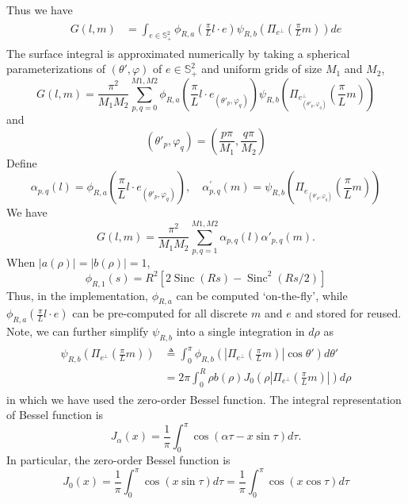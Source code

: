 \documentclass[11pt]{amsart}
\newcommand{\Sinc}{\operatorname{Sinc}}
\begin{document}
Thus we have
\begin{multline*}
\begin{split}
G(l, m)
 & = \int_{e \in \mathbb{S}^{2}_+} \phi_{R,a}\left(\frac{\pi}{L}l\cdot e\right) 
 \psi_{R,b}\left(\Pi_{e^{\perp}}(\frac{\pi}{L}m)\right)  de
\end{split}
\end{multline*}
The surface integral is approximated numerically by taking a spherical parameterizations of $(\theta', \varphi)$ of $e \in \mathbb{S}^{2}_+$ and uniform grids of size $M_1$ and $M_2$,
\begin{equation*}
G(l, m)
  = \frac{\pi^2}{M_1M_2}\sum_{p,q=0}^{M1,M2} \phi_{R,a}\left(\frac{\pi}{L}l\cdot e_{(\theta'_p,\varphi_q)}\right) 
 \psi_{R,b}\left(\Pi_{e^{\perp}_{(\theta'_p,\varphi_q)}}\left(\frac{\pi}{L}m \right) \right)
 \end{equation*}
 and
 \begin{equation*}
 \left(\theta'_{p}, \varphi_{q}\right)=\left(\frac{p \pi}{M_{1}}, \frac{q \pi}{M_{2}}\right)
 \end{equation*}
 Define
 \begin{equation*}
 \alpha_{p, q}(l)=\phi_{R, a}\left(\frac{\pi}{L}l \cdot e_{\left(\theta'_{p}, \varphi_{q}\right)}\right), \quad \alpha_{p, q}^{\prime}(m)=\psi_{R, b}\left(\Pi_{e_{(\theta'_p, \varphi_{q})} }\left(\frac{\pi}{L}m \right)\right)
 \end{equation*}
We have
\begin{equation*}
G(l, m)
  = \frac{\pi^2}{M_1M_2}\sum_{p,q=1}^{M1,M2}\alpha_{p,q}(l) \alpha'_{p,q}(m).
 \end{equation*}
When $|a(\rho)|  = |b(\rho)|= 1$,
\begin{equation*}
\phi_{R,1}(s) = R^2[2\Sinc(Rs) - \Sinc^2(Rs/2)]
\end{equation*}
Thus, in the implementation, $\phi_{R,a}$ can be computed `on-the-fly', while $\phi_{R,a}\left(\frac{\pi}{L}l\cdot e\right)$ can be pre-computed for all discrete $m$ and $e$ and stored for reused. 
Note, we can further simplify $\psi_{R,b}$ into a single integration in $d\rho$ as
\begin{multline*}
\begin{split}
\psi_{R,b}\left(\Pi_{e^{\perp}}\left(\frac{\pi}{L}m \right) \right ) &\triangleq \int_0^{\pi}  \phi_{R,b}\left( \left\vert\Pi_{e^{\perp}}\left(\frac{\pi}{L}m \right) \right \vert \cos \theta' \right) d \theta'  \\ 
&  = 2\pi \int_0^R \rho  b(\rho ) J_0\left(\rho\left \vert \Pi_{e^{\perp}}\left(\frac{\pi}{L}m \right) \right \vert \right) d\rho
\end{split}
\end{multline*}
in which  we have used the zero-order Bessel function. The integral representation of Bessel function is 
\begin{equation*}
J_{\alpha}(x)=\frac{1}{ \pi} \int_{0}^{\pi} \cos (\alpha \tau-x \sin \tau) d \tau.
\end{equation*}
In particular, the zero-order Bessel function is
\begin{equation}
J_{0}(x)=\frac{1}{\pi} \int_{0}^{\pi} \cos(x \sin \tau) d \tau = \frac{1}{\pi} \int_{0}^{\pi} \cos(x \cos \tau) d \tau
\end{equation}
\end{document}

